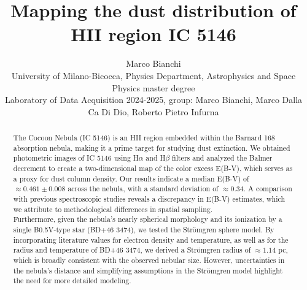 \documentclass[fleqn,usenatbib]{mnras}
\title[]{Mapping the dust distribution of HII region IC 5146}
\author[Marco Bianchi]{
Marco Bianchi
\\
University of Milano-Bicocca, Physics Department, Astrophysics and Space Physics master degree\\
Laboratory of Data Acquisition 2024-2025, group: Marco Bianchi, Marco Dalla Ca Di Dio, Roberto Pietro Infurna
}
\begin{document}
\label{firstpage}
\pagerange{\pageref{firstpage}--\pageref{lastpage}}
\maketitle

\begin{abstract}
  \large The Cocoon Nebula (IC 5146) is an HII region embedded within the Barnard 168 absorption nebula, making it a prime target for studying dust extinction. 
  We obtained photometric images of IC 5146 using H$\alpha$ and H$\beta$ filters and analyzed the Balmer decrement to create a two-dimensional map of the color excess E(B-V), which serves as a proxy for dust column density. 
  Our results indicate a median E(B-V) of $\approx 0.461 \pm 0.008$ across the nebula, with a standard deviation of $\approx 0.34$. 
  A comparison with previous spectroscopic studies reveals a discrepancy in E(B-V) estimates, which we attribute to methodological differences in spatial sampling.\\
  Furthermore, given the nebula's nearly spherical morphology and its ionization by a single B0.5V-type star (BD+46 3474), we tested the Strömgren sphere model. 
  By incorporating literature values for electron density and temperature, as well as for the radius and temperature of BD+46 3474, we derived a Strömgren radius of $\approx 1.14$ pc, which is broadly consistent with the observed nebular size. 
  However, uncertainties in the nebula's distance and simplifying assumptions in the Strömgren model highlight the need for more detailed modeling.
\end{abstract} 




\end{document}
